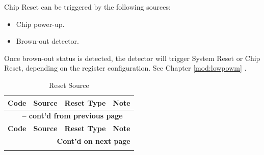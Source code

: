 \documentclass[main\_\_EN.tex]{subfiles}
\begin{document}
\begin{ThreePartTable}

\begin{TableNotes}
    \item[1] Chip Reset can be triggered by the following sources:
        \begin{itemize}
        \item Chip power-up.
        \item Brown-out detector.
        \end{itemize}
    \item[2] Once brown-out status is detected, the detector will trigger System Reset or Chip Reset, depending on the register configuration. See Chapter  \ref{mod:lowpowm} \textit{}.
\end{TableNotes}

\begin{longtable}[c]{ |l|m{3.5cm}|m{1.8cm}|m{9.2cm}| }
    \caption{Reset Source}
    \label{tab:resclk-reset-src}\\\hline

    \rowcolor{lightgray}
    \textbf{Code} & \textbf{Source} & \textbf{Reset Type} &   \textbf{Note} \\\hline
    \endfirsthead


    \multicolumn{4}{c}{\bfseries \tablename\ \thetable{} -- cont'd from previous page}\\\hline
    \rowcolor{lightgray}
    \textbf{Code} & \textbf{Source} & \textbf{Reset Type} &   \textbf{Note} \\\hline
    \endhead

    \multicolumn{4}{r}{\textbf{Cont'd on next page}} \\
    \endfoot


\end{longtable}
\end{ThreePartTable}
\end{document}
